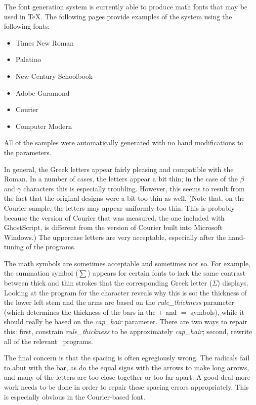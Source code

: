\documentclass[12pt]{article}
\begin{document}
The font generation system is currently able to produce math fonts that may be
used in \TeX. The following pages provide examples of the system using the
following fonts:
\begin{itemize}
\item Times New Roman
\item Palatino
\item New Century Schoolbook
\item Adobe Garamond
\item Courier
\item Computer Modern
\end{itemize}
All of the samples were automatically generated with no hand modifications to
the parameters.

In general, the Greek letters appear fairly pleasing and compatible with the
Roman. In a number of cases, the letters appear a bit thin; in the case of the
$\beta$ and $\gamma$ characters this is especially troubling. However, this
seems to result from the fact that the original designs were a bit too thin as
well. (Note that, on the Courier sample, the letters may appear uniformly too
thin. This is probably because the version of Courier that was measured, the one
included with GhostScript, is different from the version of Courier built into
Microsoft Windows.) The uppercase letters are very acceptable, especially after
the hand-tuning of the programs.

The math symbols are sometimes acceptable and sometimes not so. For example, the
summation symbol ($\sum$) appears for certain fonts to lack the same contrast
between thick and thin strokes that the corresponding Greek letter ($\Sigma$)
displays. Looking at the program for the character reveals why this is so: the
thickness of the lower left stem and the arms are based on the
\emph{rule\_thickness} parameter (which determines the thickness of the bars in
the $+$ and $=$ symbols), while it should really be based on the
\emph{cap\_hair} parameter. There are two ways to repair this: first, constrain
\emph{rule\_thickness} to be approximately \emph{cap\_hair}; second, rewrite all
of the relevant \MF\ programs.

The final concern is that the spacing is often egregiously wrong. The radicals
fail to abut with the bar, as do the equal signs with the arrows to make long
arrows, and many of the letters are too close together or too far apart. A good
deal more work needs to be done in order to repair these spacing errors
appropriately. This is especially obvious in the Courier-based font.
\end{document}
